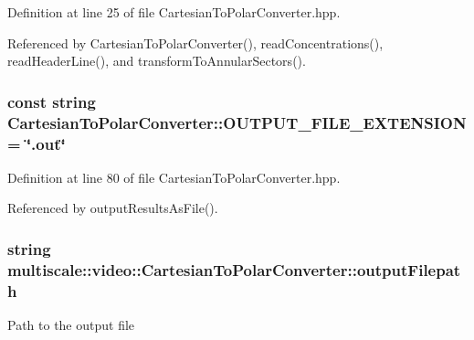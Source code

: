\-Definition at line 25 of file \-Cartesian\-To\-Polar\-Converter.\-hpp.



\-Referenced by \-Cartesian\-To\-Polar\-Converter(), read\-Concentrations(), read\-Header\-Line(), and transform\-To\-Annular\-Sectors().

\hypertarget{classmultiscale_1_1video_1_1CartesianToPolarConverter_a3dcad19e1da427627d783a3053174372}{
\subsubsection[{\-O\-U\-T\-P\-U\-T\-\_\-\-F\-I\-L\-E\-\_\-\-E\-X\-T\-E\-N\-S\-I\-O\-N}]{\setlength{\rightskip}{0pt plus 5cm}const string {\bf \-Cartesian\-To\-Polar\-Converter\-::\-O\-U\-T\-P\-U\-T\-\_\-\-F\-I\-L\-E\-\_\-\-E\-X\-T\-E\-N\-S\-I\-O\-N} = \char`\"{}.out\char`\"{}}}\label{classmultiscale_1_1video_1_1CartesianToPolarConverter_a3dcad19e1da427627d783a3053174372}


\-Definition at line 80 of file \-Cartesian\-To\-Polar\-Converter.\-hpp.



\-Referenced by output\-Results\-As\-File().

\hypertarget{classmultiscale_1_1video_1_1CartesianToPolarConverter_a024d95ab3b9de6ed6fd1d951c5575e65}{
\subsubsection[{output\-Filepath}]{\setlength{\rightskip}{0pt plus 5cm}string {\bf multiscale\-::video\-::\-Cartesian\-To\-Polar\-Converter\-::output\-Filepath}}}\label{classmultiscale_1_1video_1_1CartesianToPolarConverter_a024d95ab3b9de6ed6fd1d951c5575e65}
\-Path to the output file 

